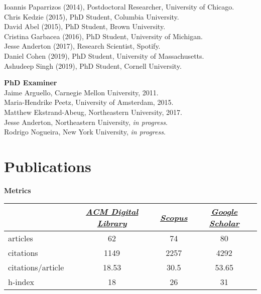 \documentclass{article}
\begin{document}
\vspace{\baselineskip}

\noindent Ioannis Paparrizos (2014), Postdoctoral Researcher, University of Chicago.\\
Chris Kedzie (2015), PhD Student,  Columbia University.\\
David Abel (2015), PhD Student, Brown University.\\
Cristina Garbacea (2016), PhD Student, University of Michigan.\\
Jesse Anderton (2017), Research Scientist, Spotify.\\
Daniel Cohen (2019), PhD Student, University of Massachusetts.  \\
Ashudeep Singh (2019), PhD Student, Cornell University.  
	
\vspace{\baselineskip}
\noindent\textbf{PhD Examiner}\\
Jaime Arguello, Carnegie Mellon University, 2011.\\
Maria-Hendrike Peetz, University of Amsterdam, 2015.\\
Matthew Ekstrand-Abeug, Northeastern University, 2017.\\
Jesse Anderton, Northeastern University, \emph{in progress}.\\
Rodrigo Nogueira, New York University, \emph{in progress}.

\setlength{\leftmargini}{0em}
 \section{Publications}\noindent\textbf{Metrics}\\
\noindent\begin{center}\begin{tabular}{lccc}
&\href{http://dl.acm.org/author\_page.cfm?id=81551748956}{\textit{ACM Digital Library}}&\href{https://www.scopus.com/authid/detail.uri?authorId=55605195900}{\textit{Scopus}}&\href{http://scholar.google.com/citations?user=212SLn0AAAAJ}{\textit{Google Scholar}}\\
\hline
articles&62&74&80\\
citations&1149&2257&4292\\
citations/article&18.53&30.5&53.65\\
h-index&18&26&31
\end{tabular}
\end{center}
\end{document}
